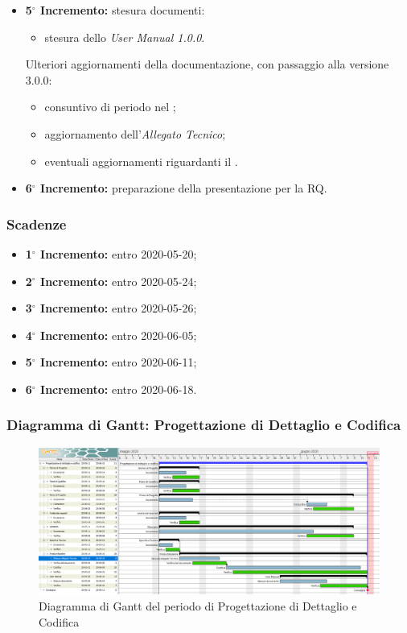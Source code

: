 \begin{itemize}
				\item \textbf{5$^{\circ}$ Incremento:} stesura documenti:
				\begin{itemize}
					\item stesura dello \textit{User Manual 1.0.0}.
				\end{itemize}
				Ulteriori aggiornamenti della documentazione, con passaggio alla versione 3.0.0:%
					\begin{itemize}
						\item consuntivo di periodo nel \PdP{};
						\item aggiornamento dell'\textit{Allegato Tecnico};
						\item eventuali aggiornamenti riguardanti il \Glossario{}.
					\end{itemize}
				\item \textbf{6$^{\circ}$ Incremento:} preparazione della presentazione per la RQ.
			\end{itemize}
		\subsubsection{Scadenze}
			\begin{itemize}
				\item \textbf{1$^{\circ}$ Incremento:} entro 2020-05-20;
				\item \textbf{2$^{\circ}$ Incremento:} entro 2020-05-24;
				\item \textbf{3$^{\circ}$ Incremento:} entro 2020-05-26;
				\item \textbf{4$^{\circ}$ Incremento:} entro 2020-06-05;
				\item \textbf{5$^{\circ}$ Incremento:} entro 2020-06-11;
				\item \textbf{6$^{\circ}$ Incremento:} entro 2020-06-18.
			\end{itemize}
	\subsubsection{Diagramma di Gantt: Progettazione di Dettaglio e Codifica}
		\begin{figure}[h]
			\centering
			\includegraphics[width=1.1\textwidth]{./res/img/DiagrammiGantt/prog_dett_gantt.png}
			\caption{Diagramma di Gantt del periodo di Progettazione di Dettaglio e Codifica}
		\end{figure}
\newpage
